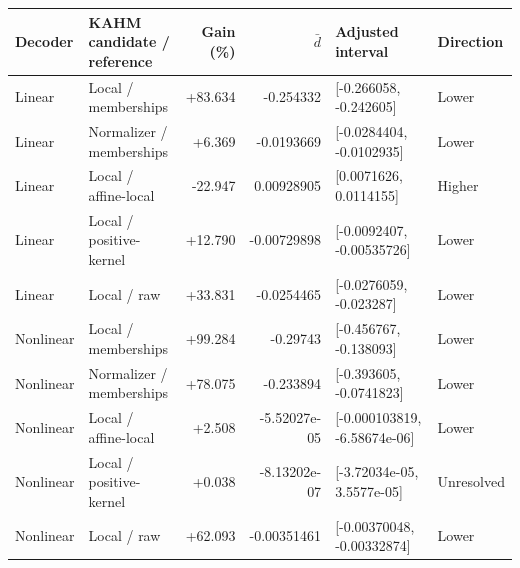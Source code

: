 \begin{tabular}{llrrll}
\toprule
Decoder & KAHM candidate / reference & Gain (\%) & $\bar d$ & Adjusted interval & Direction \\
\midrule
Linear & Local / memberships & +83.634 & -0.254332 & [-0.266058, -0.242605] & Lower \\
Linear & Normalizer / memberships & +6.369 & -0.0193669 & [-0.0284404, -0.0102935] & Lower \\
Linear & Local / affine-local & -22.947 & 0.00928905 & [0.0071626, 0.0114155] & Higher \\
Linear & Local / positive-kernel & +12.790 & -0.00729898 & [-0.0092407, -0.00535726] & Lower \\
Linear & Local / raw & +33.831 & -0.0254465 & [-0.0276059, -0.023287] & Lower \\
\midrule
Nonlinear & Local / memberships & +99.284 & -0.29743 & [-0.456767, -0.138093] & Lower \\
Nonlinear & Normalizer / memberships & +78.075 & -0.233894 & [-0.393605, -0.0741823] & Lower \\
Nonlinear & Local / affine-local & +2.508 & -5.52027e-05 & [-0.000103819, -6.58674e-06] & Lower \\
Nonlinear & Local / positive-kernel & +0.038 & -8.13202e-07 & [-3.72034e-05, 3.5577e-05] & Unresolved \\
Nonlinear & Local / raw & +62.093 & -0.00351461 & [-0.00370048, -0.00332874] & Lower \\
\bottomrule
\end{tabular}
